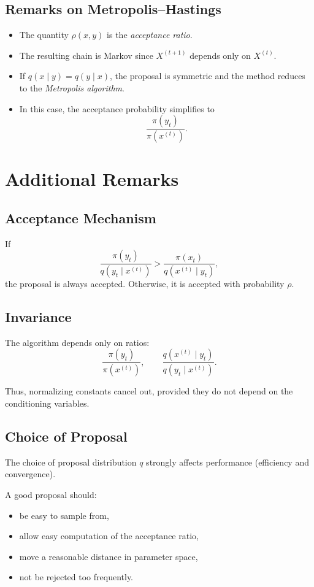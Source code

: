 \documentclass[12pt,oneside]{book}
\numberwithin{equation}{section}
\theoremstyle{definition}
\theoremstyle{plain}
\theoremstyle{remark}
\begin{document}
\subsection*{Remarks on Metropolis--Hastings}

\begin{itemize}
\item The quantity $\rho(x,y)$ is the \emph{acceptance ratio}.
\item The resulting chain is Markov since $X^{(t+1)}$ depends only on $X^{(t)}$.
\item If $q(x \mid y) = q(y \mid x)$, the proposal is symmetric and the method reduces to the \emph{Metropolis algorithm}.
\item In this case, the acceptance probability simplifies to
\[
\frac{\pi(y_t)}{\pi(x^{(t)})}.
\]
\end{itemize}

\section{Additional Remarks}

\subsection*{Acceptance Mechanism}

If
\[
\frac{\pi(y_t)}{q(y_t \mid x^{(t)})}
>
\frac{\pi(x_t)}{q(x^{(t)} \mid y_t)},
\]
the proposal is always accepted. Otherwise, it is accepted with probability $\rho$.

\subsection*{Invariance}

The algorithm depends only on ratios:
\[
\frac{\pi(y_t)}{\pi(x^{(t)})},
\qquad
\frac{q(x^{(t)} \mid y_t)}{q(y_t \mid x^{(t)})}.
\]

Thus, normalizing constants cancel out, provided they do not depend on the conditioning variables.

\subsection*{Choice of Proposal}

The choice of proposal distribution $q$ strongly affects performance (efficiency and convergence).

A good proposal should:
\begin{itemize}
\item be easy to sample from,
\item allow easy computation of the acceptance ratio,
\item move a reasonable distance in parameter space,
\item not be rejected too frequently.
\end{itemize}
\end{document}
